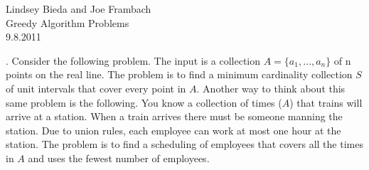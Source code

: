 \documentclass[10pt]{article}
\begin{document}
	\begin{flushright}
	Lindsey Bieda and Joe Frambach\\
	Greedy Algorithm Problems\\
	9.8.2011
	\end{flushright}
	.  Consider the following problem. The input is a collection $A = \{a_{1}, \ldots , a_{n} \}$ of n points on the real line.
	The problem is to find a minimum cardinality collection $S$ of unit intervals that cover every point in
	$A$. Another way to think about this same problem is the following. You know a collection of times ($A$)
	that trains will arrive at a station. When a train arrives there must be someone manning the station.
	Due to union rules, each employee can work at most one hour at the station. The problem is to find a
	scheduling of employees that covers all the times in $A$ and uses the fewest number of employees.
\end{document}
